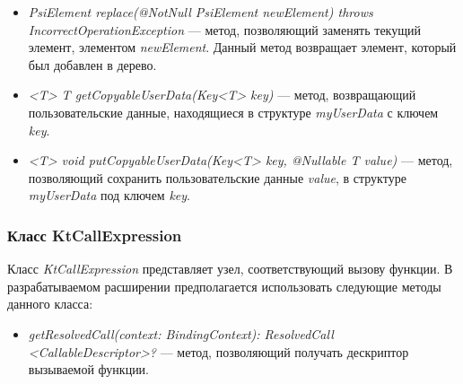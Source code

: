 \begin{itemize}
	\item \textit{PsiElement replace(@NotNull PsiElement newElement) throws
		IncorrectOperationException} --- метод, позволяющий заменять текущий
		элемент, элементом \textit{newElement}.
		Данный метод возвращает элемент, который был добавлен в дерево.
	\item \textit{<T> T getCopyableUserData(Key<T> key)} --- метод, возвращающий
		пользовательские данные, находящиеся в структуре \textit{myUserData}
		с ключем \textit{key}.
	\item \textit{<T> void putCopyableUserData(Key<T> key, @Nullable T value)}
		--- метод, позволяющий сохранить пользовательские данные
		\textit{value}, в структуре \textit{myUserData} под ключем \textit{key}.
\end{itemize}
\subsubsection{Класс KtCallExpression}
\label{ssub:kt_call_expression_description}
Класс \textit{KtCallExpression} представляет узел, соответствующий вызову
функции.
В разрабатываемом расширении предполагается использовать следующие методы
данного класса:
\begin{itemize}
	\item \textit{getResolvedCall(context: BindingContext): ResolvedCall
		<CallableDescriptor>?} --- метод, позволяющий получать дескриптор
		вызываемой функции.
\end{itemize}
